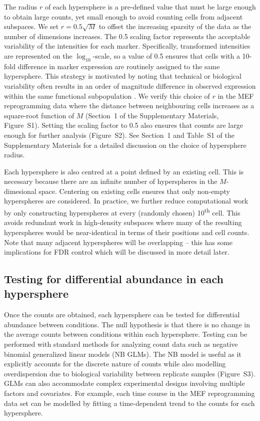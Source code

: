 \documentclass{article}
\newcommand{\supphyperradverify}{1}
\newcommand{\suppfighyperrad}{S1}
\newcommand{\suppfighypertol}{S2}
\newcommand{\suppfignbdisp}{S3}
\newcommand{\supptabparam}{S1}
\begin{document}
The radius $r$ of each hypersphere is a pre-defined value that must be large enough to obtain large counts, yet small enough to avoid counting cells from adjacent subspaces.
We set $r=0.5\sqrt{M}$ to offset the increasing sparsity of the data as the number of dimensions increases.
The 0.5 scaling factor represents the acceptable variability of the intensities for each marker.
Specifically, transformed intensities are represented on the $\log_{10}$-scale, so a value of 0.5 ensures that cells with a 10-fold difference in marker expression are routinely assigned to the same hypersphere.
This strategy is motivated by noting that technical or biological variability often results in an order of magnitude difference in observed expression within the same functional subpopulation \cite{ornatsky2008study,zunder2015continuous,zunder2015palladium}.
We verify this choice of $r$ in the MEF reprogramming data where the distance between neighbouring cells increases as a square-root function of $M$ (Section~\supphyperradverify{} of the Supplementary Materials, Figure~\suppfighyperrad{}).
Setting the scaling factor to 0.5 also ensures that counts are large enough for further analysis (Figure~\suppfighypertol{}).
See Section~\supphyperradverify{} and Table~\supptabparam{} of the Supplementary Materials for a detailed discussion on the choice of hypersphere radius.

Each hypersphere is also centred at a point defined by an existing cell.
This is necessary because there are an infinite number of hyperspheres in the $M$-dimesional space.
Centering on existing cells ensures that only non-empty hyperspheres are considered.
In practice, we further reduce computational work by only constructing hyperspheres at every (randomly chosen) 10\textsuperscript{th} cell.
This avoids redundant work in high-density subspaces where many of the resulting hyperspheres would be near-identical in terms of their positions and cell counts.
Note that many adjacent hyperspheres will be overlapping -- this has some implications for FDR control which will be discussed in more detail later.

\subsection{Testing for differential abundance in each hypersphere}
Once the counts are obtained, each hypersphere can be tested for differential abundance between conditions.
The null hypothesis is that there is no change in the average counts between conditions within each hypersphere.
Testing can be performed with standard methods for analyzing count data such as negative binomial generalized linear models (NB GLMs).
The NB model is useful as it explicitly accounts for the discrete nature of counts while also modelling overdispersion due to biological variability between replicate samples (Figure~\suppfignbdisp{}).
GLMs can also accommodate complex experimental designs involving multiple factors and covariates.
For example, each time course in the MEF reprogramming data set can be modelled by fitting a time-dependent trend to the counts for each hypersphere.
\end{document}
